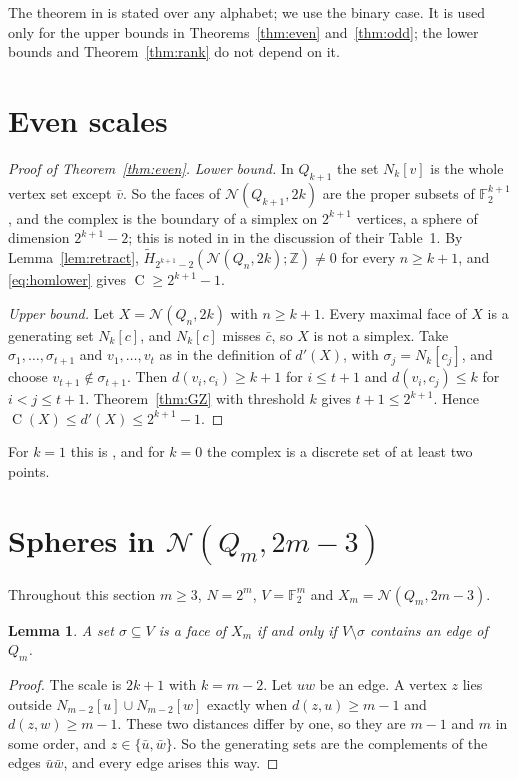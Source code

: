 \documentclass[11pt]{amsart}
\newtheorem{lemma}[theorem]{Lemma}
\theoremstyle{definition}
\theoremstyle{remark}
\newcommand{\N}{\mathcal{N}}
\newcommand{\Q}{Q}
\newcommand{\F}{\mathbb{F}}
\newcommand{\Z}{\mathbb{Z}}
\newcommand{\Hred}{\widetilde{H}}
\newcommand{\cl}[2]{N_{#1}[#2]}
\newcommand{\C}{\operatorname{C}}
\begin{document}
The theorem in \cite{GZ} is stated over any alphabet; we use the binary case. It is used only for the upper bounds in
Theorems~\ref{thm:even} and~\ref{thm:odd}; the lower bounds and Theorem~\ref{thm:rank} do not depend on it.

\section{Even scales}

\begin{proof}[Proof of Theorem~\ref{thm:even}]
\emph{Lower bound.} In $\Q_{k+1}$ the set $\cl{k}{v}$ is the whole vertex set except $\bar v$. So the faces of
$\N(\Q_{k+1},2k)$ are the proper subsets of $\F_2^{k+1}$, and the complex is the boundary of a simplex on $2^{k+1}$
vertices, a sphere of dimension $2^{k+1}-2$; this is noted in \cite{ASS} in the discussion of their Table~1. By Lemma~\ref{lem:retract}, $\Hred_{2^{k+1}-2}(\N(\Q_n,2k);\Z)\ne0$ for
every $n\ge k+1$, and \eqref{eq:homlower} gives $\C\ge2^{k+1}-1$.

\emph{Upper bound.} Let $X=\N(\Q_n,2k)$ with $n\ge k+1$. Every maximal face of $X$ is a generating set $\cl{k}{c}$, and
$\cl{k}{c}$ misses $\bar c$, so $X$ is not a simplex. Take $\sigma_1,\dots,\sigma_{t+1}$ and $v_1,\dots,v_t$ as in the
definition of $d'(X)$, with $\sigma_j=\cl{k}{c_j}$, and choose $v_{t+1}\notin\sigma_{t+1}$. Then $d(v_i,c_i)\ge k+1$
for $i\le t+1$ and $d(v_i,c_j)\le k$ for $i<j\le t+1$. Theorem~\ref{thm:GZ} with threshold $k$ gives $t+1\le2^{k+1}$.
Hence $\C(X)\le d'(X)\le2^{k+1}-1$.
\end{proof}

For $k=1$ this is \cite[Lemma~7.3]{ASS}, and for $k=0$ the complex is a discrete set of at least two points.

\section{Spheres in $\N(\Q_m,2m-3)$}

Throughout this section $m\ge3$, $N=2^m$, $V=\F_2^m$ and $X_m=\N(\Q_m,2m-3)$.

\begin{lemma}\label{lem:faces}
A set $\sigma\subseteq V$ is a face of $X_m$ if and only if $V\setminus\sigma$ contains an edge of $\Q_m$.
\end{lemma}

\begin{proof}
The scale is $2k+1$ with $k=m-2$. Let $uw$ be an edge. A vertex $z$ lies outside $\cl{m-2}{u}\cup\cl{m-2}{w}$ exactly
when $d(z,u)\ge m-1$ and $d(z,w)\ge m-1$. These two distances differ by one, so they are $m-1$ and $m$ in some order,
and $z\in\{\bar u,\bar w\}$. So the generating sets are the complements of the edges $\bar u\bar w$, and every edge
arises this way.
\end{proof}
\end{document}
